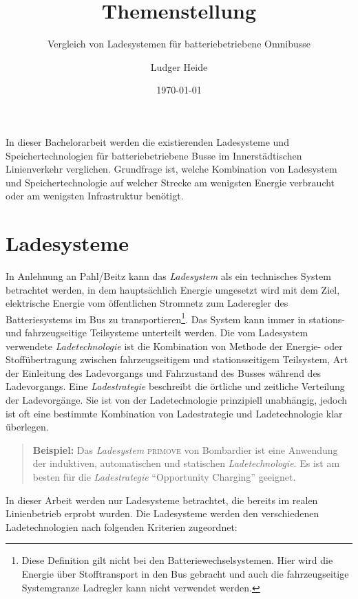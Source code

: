 \documentclass{scrartcl}
\title{Themenstellung}
\subtitle{Vergleich von Ladesystemen für batteriebetriebene Omnibusse}
\date{\today}
\author{Ludger Heide}
\begin{document}

\maketitle



In dieser Bachelorarbeit werden die existierenden Ladesysteme und Speichertechnologien für batteriebetriebene Busse im Innerstädtischen Linienverkehr verglichen. Grundfrage ist, welche Kombination von Ladesystem und Speichertechnologie auf welcher Strecke am wenigsten Energie verbraucht oder am wenigsten Infrastruktur benötigt.

\section{Ladesysteme}

In Anlehnung an Pahl/Beitz \cite[S. 258]{feldhusen2013pahl} kann das \emph{Ladesystem} als ein technisches System betrachtet werden, in dem hauptsächlich Energie umgesetzt wird mit dem Ziel, elektrische Energie vom öffentlichen Stromnetz zum Laderegler des Batteriesystems im Bus zu transportieren\footnote{Diese Definition gilt nicht bei den Batteriewechselsystemen. Hier wird die Energie über Stofftransport in den Bus gebracht und auch die fahrzeugseitige Systemgranze Ladregler kann nicht verwendet werden.}. Das System kann immer in stations- und fahrzeugseitige Teilsysteme unterteilt werden. Die vom Ladesystem verwendete \emph{Ladetechnologie} ist die Kombination von Methode der Energie- oder Stoffübertragung zwischen fahrzeugseitigem und stationsseitigem Teilsystem, Art der Einleitung des Ladevorgangs und Fahrzustand des Busses während des Ladevorgangs. Eine \emph{Ladestrategie} beschreibt die örtliche und zeitliche Verteilung der Ladevorgänge. Sie ist von der Ladetechnologie prinzipiell unabhängig, jedoch ist oft eine bestimmte Kombination von Ladestrategie und Ladetechnologie klar überlegen.

\begin{quote}
	\textbf{Beispiel:} Das \emph{Ladesystem} \textsc{primove} von Bombardier ist eine Anwendung der induktiven, automatischen und statischen \emph{Ladetechnologie}. Es ist am besten für die \emph{Ladestrategie} "`Opportunity Charging"' geeignet.
\end{quote}

In dieser Arbeit werden nur Ladesysteme betrachtet, die bereits im realen Linienbetrieb erprobt wurden. Die Ladesysteme werden den verschiedenen Ladetechnologien nach folgenden Kriterien zugeordnet:
\end{document}
